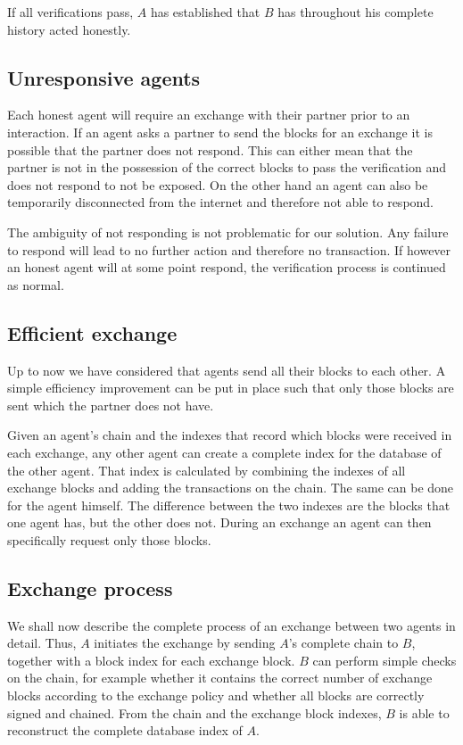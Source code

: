 If all verifications pass, $A$ has established that $B$ has throughout his complete history acted 
honestly. 

\subsection{Unresponsive agents}
Each honest agent will require an exchange with their partner prior to an interaction. If an agent 
asks a partner to send the blocks for an exchange it is possible that the partner does not respond.
This can either mean that the partner is not in the possession of the correct blocks to pass the  
verification and does not respond to not be exposed. On the other hand an agent can also be 
temporarily disconnected from the internet and therefore not able to respond.

The ambiguity of not responding is not problematic for our solution. Any failure to respond will
lead to no further action and therefore no transaction. If however an honest agent will at some 
point respond, the verification process is continued as normal.

\subsection{Efficient exchange}
Up to now we have considered that agents send all their blocks to each other. A simple efficiency 
improvement can be put in place such that only those blocks are sent which the partner does not have.

Given an agent's chain and the indexes that record which blocks were received in each exchange, any
other agent can create a complete index for the database of the other agent. That index is calculated
by combining the indexes of all exchange blocks and adding the transactions on the chain. The same
can be done for the agent himself. The difference between the two indexes are the blocks that one
agent has, but the other does not. During an exchange an agent can then specifically request only
those blocks.

\subsection{Exchange process}
We shall now describe the complete process of an exchange between two agents in detail. Thus, $A$ 
initiates the exchange by sending $A$'s complete chain to $B$, together with a block index for each 
exchange block.
$B$ can perform simple checks on the chain, for example whether it contains the correct number of exchange blocks
according to the exchange policy and whether all blocks are correctly signed and chained. From the 
chain and the exchange block indexes, $B$ is able to reconstruct the complete database index of $A$.

